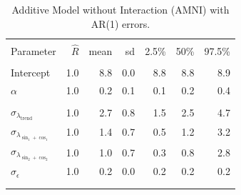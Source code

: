 \documentclass{article}\usepackage[]{graphicx}\usepackage[]{color}
\begin{document}
\begin{table}[bp!]
\caption{Additive Model without Interaction (AMNI) with AR(1) errors.}
\label{amni_ar}
\centering
\begin{tabular}{lrrrrrr}
\\[-1.8ex]\hline 
\hline \\[-1.8ex] 
Parameter & $\hat{R}$  & mean & sd & 2.5\% & 50\% & 97.5\% \\ 
\hline \\[-1.8ex] 
Intercept & 1.0 & 8.8 & 0.0 & 8.8 & 8.8 & 8.9 \\ 
$\alpha$ & 1.0 & 0.2 & 0.1 & 0.1 & 0.2 & 0.4 \\ 
\hline \\[-1.8ex] 
$\sigma_{\lambda_{\text{trend}}}$ & 1.0 & 2.7 & 0.8 & 1.5 & 2.5 & 4.7 \\ 
$\sigma_{\lambda_{\sin_{1}+\cos_{1}}}$ & 1.0 & 1.4 & 0.7 & 0.5 & 1.2 & 3.2 \\ 
$\sigma_{\lambda_{\sin_{2}+\cos_{2}}}$ & 1.0 & 1.0 & 0.7 & 0.3 & 0.8 & 2.8 \\ 
$\sigma_{\epsilon}$                    & 1.0 & 0.2 & 0.0 & 0.2 & 0.2 & 0.2 \\ 
\\[-1.8ex]\hline 
\hline \\[-1.8ex] 
\end{tabular}
\end{table}
\end{document}
